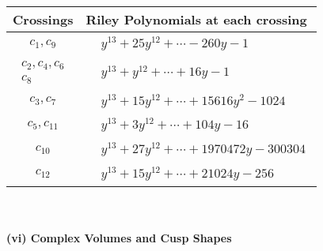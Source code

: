 \documentclass[1p]{elsarticle_modified}
\theoremstyle{definition}
\begin{document}
\begin{tabular}{m{50pt}|m{274pt}}
Crossings & \hspace{64pt}Riley Polynomials at each crossing \\
\hline $$\begin{aligned}c_{1},c_{9}\end{aligned}$$&$\begin{aligned}
&y^{13}+25 y^{12}+\cdots-260 y-1
\end{aligned}$\\
\hline $$\begin{aligned}c_{2},c_{4},c_{6}\\c_{8}\end{aligned}$$&$\begin{aligned}
&y^{13}+y^{12}+\cdots+16 y-1
\end{aligned}$\\
\hline $$\begin{aligned}c_{3},c_{7}\end{aligned}$$&$\begin{aligned}
&y^{13}+15 y^{12}+\cdots+15616 y^2-1024
\end{aligned}$\\
\hline $$\begin{aligned}c_{5},c_{11}\end{aligned}$$&$\begin{aligned}
&y^{13}+3 y^{12}+\cdots+104 y-16
\end{aligned}$\\
\hline $$\begin{aligned}c_{10}\end{aligned}$$&$\begin{aligned}
&y^{13}+27 y^{12}+\cdots+1970472 y-300304
\end{aligned}$\\
\hline $$\begin{aligned}c_{12}\end{aligned}$$&$\begin{aligned}
&y^{13}+15 y^{12}+\cdots+21024 y-256
\end{aligned}$\\
\hline
\end{tabular}\\~\\
\newpage\flushleft \textbf{(vi) Complex Volumes and Cusp Shapes}
\end{document}
